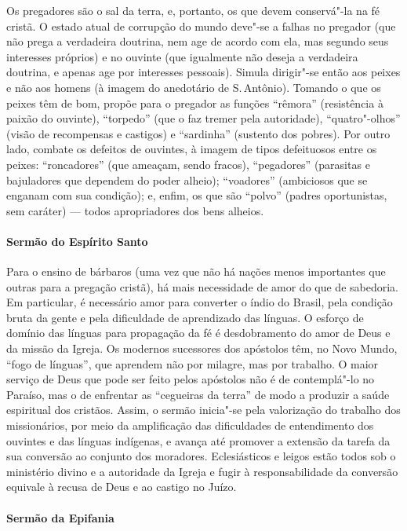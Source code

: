 Os pregadores são o sal da terra, e, portanto, os que devem conservá"-la na fé cristã. O estado atual de corrupção do mundo deve"-se a falhas no pregador (que não prega a verdadeira
doutrina, nem age de acordo com ela, mas segundo seus interesses próprios) e no ouvinte
(que igualmente não deseja a verdadeira doutrina, e apenas age por interesses pessoais).
Simula dirigir"-se então aos peixes e não aos homens (à imagem do anedotário de S.\,Antônio).
Tomando o que os peixes têm de bom, propõe para o pregador as funções ``rêmora'' (resistência
à paixão do ouvinte), ``torpedo'' (que o faz tremer pela autoridade), ``quatro"-olhos'' (visão de recompensas e castigos) e ``sardinha'' (sustento dos pobres). Por outro lado, combate os defeitos de ouvintes, à imagem de tipos defeituosos entre os peixes: ``roncadores'' (que ameaçam,
sendo fracos), ``pegadores'' (parasitas e bajuladores que dependem do poder alheio);
``voadores'' (ambiciosos que se enganam com sua condição); e, enfim, os que são ``polvo''
(padres oportunistas, sem caráter) --- todos apropriadores dos bens alheios.

\paragraph{Sermão do Espírito Santo}

Para o ensino de bárbaros (uma vez que não há nações menos importantes que outras para
a pregação cristã), há mais necessidade de amor do que de sabedoria. Em particular, é
necessário amor para converter o índio do Brasil, pela condição bruta da gente e pela
dificuldade de aprendizado das línguas. O esforço de domínio das línguas para propagação
da fé é desdobramento do amor de Deus e da missão da Igreja. Os modernos sucessores dos
apóstolos têm, no Novo Mundo, ``fogo de línguas'', que aprendem não por milagre, mas por
trabalho. O maior serviço de Deus que pode ser feito pelos apóstolos não é de contemplá"-lo
no Paraíso, mas o de enfrentar as ``cegueiras da terra'' de modo a produzir a saúde espiritual dos cristãos.
Assim, o sermão inicia"-se pela valorização do trabalho dos missionários, por meio da
amplificação das dificuldades de entendimento dos ouvintes e das línguas indígenas, e
avança até promover a extensão da tarefa da sua conversão ao conjunto dos moradores.
Eclesiásticos e leigos estão todos sob o ministério divino e a autoridade da Igreja e fugir à
responsabilidade da conversão equivale à recusa de Deus e ao castigo no Juízo.

\paragraph{Sermão da Epifania}

